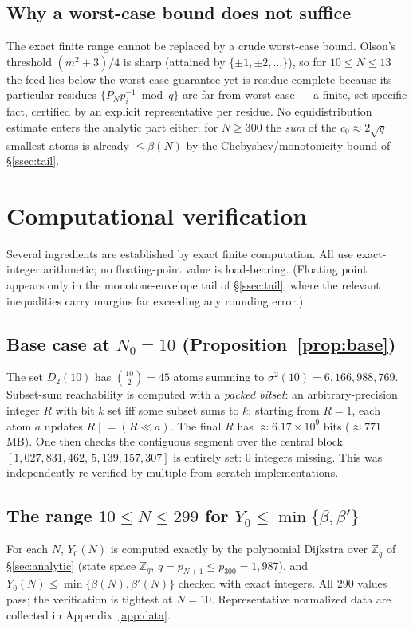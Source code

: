 \documentclass[11pt]{amsart}
\theoremstyle{plain}
\theoremstyle{definition}
\newcommand{\Z}{\mathbb{Z}}
\begin{document}
\subsection{Why a worst-case bound does not suffice}
\label{ssec:worstcase}
The exact finite range cannot be replaced by a crude worst-case bound.  Olson's
threshold $(m^2+3)/4$ is sharp (attained by $\{\pm1,\pm2,\dots\}$), so for
$10\le N\le 13$ the feed lies below the worst-case guarantee yet is
residue-complete because its particular residues $\{P_Np_i^{-1}\bmod q\}$ are far
from worst-case --- a finite, set-specific fact, certified by an explicit
representative per residue.  No equidistribution estimate enters the analytic part
either: for $N\ge300$ the \emph{sum} of the $c_0\approx2\sqrt q$ smallest atoms is
already $\le\beta(N)$ by the Chebyshev/monotonicity bound of \S\ref{ssec:tail}.

\section{Computational verification}\label{sec:comp}

Several ingredients are established by exact finite computation.  All use
exact-integer arithmetic; no floating-point value is load-bearing.  (Floating
point appears only in the monotone-envelope tail of \S\ref{ssec:tail}, where the
relevant inequalities carry margins far exceeding any rounding error.)

\subsection*{Base case at \texorpdfstring{$N_0=10$}{N0=10} (Proposition~\ref{prop:base})}
The set $D_2(10)$ has $\binom{10}{2}=45$ atoms summing to
$\sigma^2(10)=6{,}166{,}988{,}769$.  Subset-sum reachability is computed with a
\emph{packed bitset}: an arbitrary-precision integer $R$ with bit $k$ set iff
some subset sums to $k$; starting from $R=1$, each atom $a$ updates
$R\mathrel{|}{=}(R\ll a)$.  The final $R$ has $\approx 6.17\times10^9$ bits
($\approx 771$\,MB).  One then checks the contiguous segment over the central
block $[1{,}027{,}831{,}462,\,5{,}139{,}157{,}307]$ is entirely set: $0$ integers
missing.  This was independently re-verified by multiple from-scratch
implementations.

\subsection*{The range \texorpdfstring{$10\le N\le 299$}{10..299} for
$Y_0\le\min\{\beta,\beta'\}$}
For each $N$, $Y_0(N)$ is computed exactly by the polynomial Dijkstra over $\Z_q$
of \S\ref{sec:analytic} (state space $\Z_q$, $q=p_{N+1}\le p_{300}=1{,}987$), and
$Y_0(N)\le\min\{\beta(N),\beta'(N)\}$ checked with exact integers.  All $290$ values
pass; the verification is tightest at $N=10$.  Representative normalized data are
collected in Appendix~\ref{app:data}.
\end{document}

